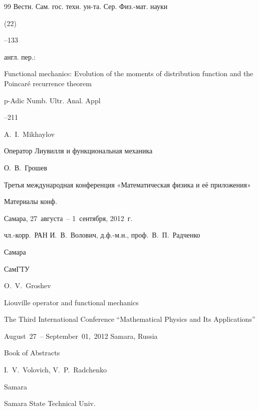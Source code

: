 \begin{thebibliography}{99}
\jour Вестн. Сам. гос. техн. ун-та. Сер. Физ.-мат. науки


(22)

--133


\transl англ. пер.:~

\paper Functional mechanics: Evolution of the moments of distribution function and the Poincar\'e recurrence theorem

\jour p-Adic Numb. Ultr. Anal. Appl




--211

\by A.~I.~Mikhaylov 






\paper Оператор Лиувилля и функциональная механика

\by О.~В.~Грошев

\inbook Третья международная конференция «Математическая физика и её приложения»

\bookinfo Материалы конф.

\procinfo Самара, 27~августа~– 1~сентября, 2012~г.

\eds чл.-корр.~РАН И.~В.~Волович, д.ф.-м.н., проф.~В.~П.~Радченко

\publaddr Самара

\publ СамГТУ



\misctransl

\by O.~V.~Groshev

\paper Liouville operator and functional mechanics

\inbook The Third International Conference ``Mathematical Physics and Its Applications''

\procinfo August~27~– September~01,~2012 Samara, Russia

\bookinfo Book of Abstracts

\eds I.~V.~Volovich, V.~P.~Radchenko

\publaddr Samara

\publ Samara State Technical Univ.












\end{thebibliography}
